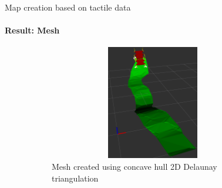 \documentclass[aspectratio=169]{beamer}
\begin{document}
\begin{frame}[t]{Map creation based on tactile data}
    \framesubtitle{Result: Mesh}
    \vspace{-15pt}
    \begin{figure}[H]
        \begin{subfigure}[t]{0.49\textwidth}
            \centering\includegraphics[height=5cm,width=1\textwidth,keepaspectratio]{mesh_rviz.png}
            \caption*{Mesh created using concave hull 2D Delaunay triangulation}
        \end{subfigure}
        \begin{subfigure}[t]{0.49\textwidth}
                \centering
\end{subfigure}
\end{figure}
\end{frame}
\end{document}
